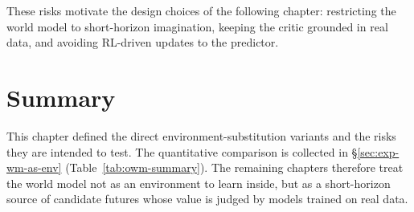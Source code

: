These risks motivate the design choices of the following chapter:
restricting the world model to short-horizon imagination, keeping the critic
grounded in real data, and avoiding RL-driven updates to the predictor.


\section{Summary}
\label{sec:wmep-summary}

This chapter defined the direct environment-substitution variants and the risks
they are intended to test. The quantitative comparison is collected in
\S\ref{sec:exp-wm-as-env} (Table~\ref{tab:owm-summary}). The remaining chapters
therefore treat the world model not as an environment to learn inside, but as a
short-horizon source of candidate futures whose value is judged by models trained
on real data.
